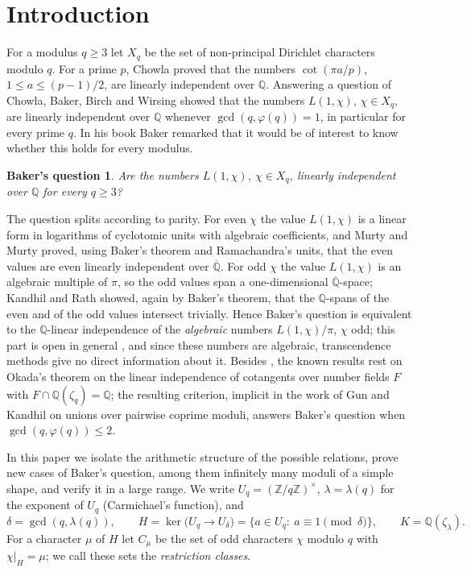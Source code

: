 \documentclass[11pt]{amsart}
\newtheorem*{question}{Baker's question}
\theoremstyle{definition}
\theoremstyle{remark}
\providecommand{\Q}{\mathbb Q}
\providecommand{\Z}{\mathbb Z}
\newcommand{\Qb}{\overline{\mathbb Q}}
\numberwithin{equation}{section}
\begin{document}
\section{Introduction}

For a modulus $q\ge3$ let $X_q$ be the set of non-principal Dirichlet characters modulo $q$.
For a prime $p$, Chowla \cite{Cho70} proved that the numbers $\cot(\pi a/p)$, $1\le a\le (p-1)/2$, are linearly independent over $\Q$.
Answering a question of Chowla, Baker, Birch and Wirsing \cite{BBW73} showed that the numbers $L(1,\chi)$, $\chi\in X_q$, are linearly independent over $\Q$ whenever $\gcd(q,\varphi(q))=1$, in particular for every prime $q$.
In his book \cite[p.~48]{Bak75} Baker remarked that it would be of interest to know whether this holds for every modulus.

\begin{question}
Are the numbers $L(1,\chi)$, $\chi\in X_q$, linearly independent over $\Q$ for every $q\ge3$?
\end{question}

The question splits according to parity.
For even $\chi$ the value $L(1,\chi)$ is a linear form in logarithms of cyclotomic units with algebraic coefficients, and Murty and Murty \cite{MM11} proved, using Baker's theorem and Ramachandra's units, that the even values are even linearly independent over $\Qb$.
For odd $\chi$ the value $L(1,\chi)$ is an algebraic multiple of $\pi$, so the odd values span a one-dimensional $\Qb$-space; Kandhil and Rath \cite{KR22} showed, again by Baker's theorem, that the $\Q$-spans of the even and of the odd values intersect trivially.
Hence Baker's question is equivalent to the $\Q$-linear independence of the \emph{algebraic} numbers $L(1,\chi)/\pi$, $\chi$ odd; this part is open in general \cite{KR22}, and since these numbers are algebraic, transcendence methods give no direct information about it.
Besides \cite{BBW73}, the known results rest on Okada's theorem \cite{Oka80} on the linear independence of cotangents over number fields $F$ with $F\cap\Q(\zeta_q)=\Q$; the resulting criterion, implicit in the work of Gun and Kandhil \cite[Theorem~2]{GK22} on unions over pairwise coprime moduli, answers Baker's question when $\gcd(q,\varphi(q))\le2$.

In this paper we isolate the arithmetic structure of the possible relations, prove new cases of Baker's question, among them infinitely many moduli of a simple shape, and verify it in a large range.
We write $U_q=(\Z/q\Z)^\times$, $\lambda=\lambda(q)$ for the exponent of $U_q$ (Carmichael's function), and
\[
\delta=\gcd(q,\lambda(q)),\qquad H=\ker\bigl(U_q\to U_\delta\bigr)=\{a\in U_q:\ a\equiv1\pmod\delta\},\qquad K=\Q(\zeta_\lambda).
\]
For a character $\mu$ of $H$ let $C_\mu$ be the set of odd characters $\chi$ modulo $q$ with $\chi|_H=\mu$; we call these sets the \emph{restriction classes}.
\end{document}
